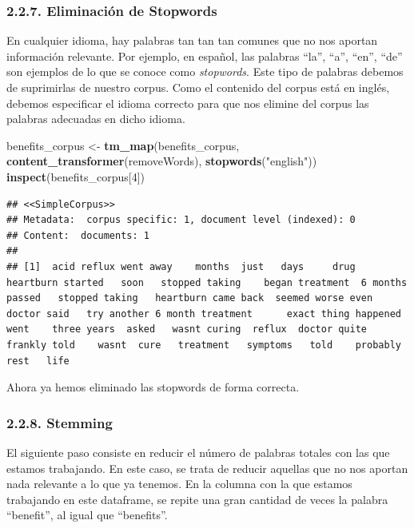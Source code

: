 \documentclass[spanish,]{article}
\newenvironment{Shaded}{\begin{snugshade}}{\end{snugshade}}
\newcommand{\DecValTok}[1]{\textcolor[rgb]{0.00,0.00,0.81}{#1}}
\newcommand{\KeywordTok}[1]{\textcolor[rgb]{0.13,0.29,0.53}{\textbf{#1}}}
\newcommand{\NormalTok}[1]{#1}
\newcommand{\StringTok}[1]{\textcolor[rgb]{0.31,0.60,0.02}{#1}}
\begin{document}
\hypertarget{eliminacion-de-stopwords}{%
\subsubsection{2.2.7. Eliminación de
Stopwords}\label{eliminacion-de-stopwords}}

En cualquier idioma, hay palabras tan tan tan comunes que no nos aportan
información relevante. Por ejemplo, en español, las palabras ``la'',
``a'', ``en'', ``de'' son ejemplos de lo que se conoce como
\textit{stopwords}. Este tipo de palabras debemos de suprimirlas de
nuestro corpus. Como el contenido del corpus está en inglés, debemos
especificar el idioma correcto para que nos elimine del corpus las
palabras adecuadas en dicho idioma.

\begin{Shaded}
\begin{Highlighting}[]
\NormalTok{benefits_corpus <-}\StringTok{ }\KeywordTok{tm_map}\NormalTok{(benefits_corpus, }\KeywordTok{content_transformer}\NormalTok{(removeWords), }
          \KeywordTok{stopwords}\NormalTok{(}\StringTok{"english"}\NormalTok{))}
\KeywordTok{inspect}\NormalTok{(benefits_corpus[}\DecValTok{4}\NormalTok{])}
\end{Highlighting}
\end{Shaded}

\begin{verbatim}
## <<SimpleCorpus>>
## Metadata:  corpus specific: 1, document level (indexed): 0
## Content:  documents: 1
## 
## [1]  acid reflux went away    months  just   days     drug  heartburn started   soon   stopped taking    began treatment  6 months passed   stopped taking   heartburn came back  seemed worse even  doctor said   try another 6 month treatment      exact thing happened  went    three years  asked   wasnt curing  reflux  doctor quite frankly told    wasnt  cure   treatment   symptoms   told    probably      rest   life
\end{verbatim}

Ahora ya hemos eliminado las stopwords de forma correcta.

\hypertarget{stemming}{%
\subsubsection{2.2.8. Stemming}\label{stemming}}

El siguiente paso consiste en reducir el número de palabras totales con
las que estamos trabajando. En este caso, se trata de reducir aquellas
que no nos aportan nada relevante a lo que ya tenemos. En la columna con
la que estamos trabajando en este dataframe, se repite una gran cantidad
de veces la palabra ``benefit'', al igual que ``benefits''.
\end{document}
